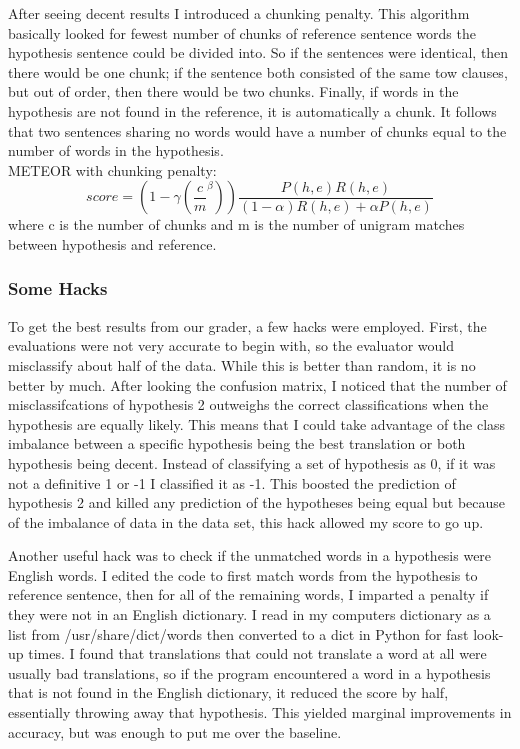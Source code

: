 \documentclass{article}
\begin{document}
After seeing decent results I introduced a chunking penalty. This algorithm basically looked for fewest number of chunks of reference sentence words the hypothesis sentence could be divided into. So if the sentences were identical, then there would be one chunk; if the sentence both consisted of the same tow clauses, but out of order, then there would be two chunks. Finally, if words in the hypothesis are not found in the reference, it is automatically a chunk. It follows that two sentences sharing no words would have a number of chunks equal to the number of words in the hypothesis.
\\
METEOR with chunking penalty:
$$score = (1-\gamma(\frac{c}{m}^{\beta}))\frac{P(h,e)R(h,e)}{(1-\alpha)R(h,e) + \alpha P(h,e)} $$
where c is the number of chunks and m is the number of unigram matches between hypothesis and reference.
\\


\subsubsection{Some Hacks}
\par
To get the best results from our grader, a few hacks were employed. First, the evaluations were not very accurate to begin with, so the evaluator would misclassify about half of the data. While this is better than random, it is no better by much. After looking the confusion matrix, I noticed that the number of misclassifcations of hypothesis 2 outweighs the correct classifications when the hypothesis are equally likely. This means that I could take advantage of  the class imbalance between a specific hypothesis being the best translation or both hypothesis being decent. Instead of classifying a set of hypothesis as 0, if it was not a definitive 1 or -1 I classified it as -1. This boosted the prediction of hypothesis 2 and killed any prediction of the hypotheses being equal but because of the imbalance of data in the data set, this hack allowed my score to go up. 
\par
Another useful hack was to check if the unmatched words in a hypothesis were English words. I edited the code to first match words from the hypothesis to reference sentence, then for all of the remaining words, I imparted a penalty if they were not in an English dictionary. I read in my computers dictionary as a list from /usr/share/dict/words then converted to a dict in Python for fast look-up times. I found that translations that could not translate a word at all were usually bad translations, so if the program encountered a word in a hypothesis that is not found in the English dictionary, it reduced the score by half, essentially throwing away that hypothesis. This yielded marginal improvements in accuracy, but was enough to put me over the baseline. 
\end{document}
